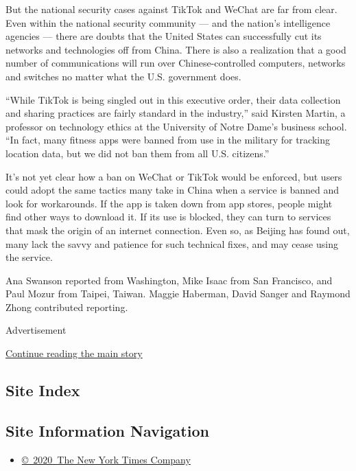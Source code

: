 But the national security cases against TikTok and WeChat are far from
clear. Even within the national security community --- and the nation's
intelligence agencies --- there are doubts that the United States can
successfully cut its networks and technologies off from China. There is
also a realization that a good number of communications will run over
Chinese-controlled computers, networks and switches no matter what the
U.S. government does.

``While TikTok is being singled out in this executive order, their data
collection and sharing practices are fairly standard in the industry,''
said Kirsten Martin, a professor on technology ethics at the University
of Notre Dame's business school. ``In fact, many fitness apps were
banned from use in the military for tracking location data, but we did
not ban them from all U.S. citizens.''

It's not yet clear how a ban on WeChat or TikTok would be enforced, but
users could adopt the same tactics many take in China when a service is
banned and look for workarounds. If the app is taken down from app
stores, people might find other ways to download it. If its use is
blocked, they can turn to services that mask the origin of an internet
connection. Even so, as Beijing has found out, many lack the savvy and
patience for such technical fixes, and may cease using the service.

Ana Swanson reported from Washington, Mike Isaac from San Francisco, and
Paul Mozur from Taipei, Taiwan. Maggie Haberman, David Sanger and
Raymond Zhong contributed reporting.

Advertisement

\protect\hyperlink{after-bottom}{Continue reading the main story}

\hypertarget{site-index}{%
\subsection{Site Index}\label{site-index}}

\hypertarget{site-information-navigation}{%
\subsection{Site Information
Navigation}\label{site-information-navigation}}

\begin{itemize}
\tightlist
\item
  \href{https://help.nytimes3xbfgragh.onion/hc/en-us/articles/115014792127-Copyright-notice}{©~2020~The
  New York Times Company}
\end{itemize}

